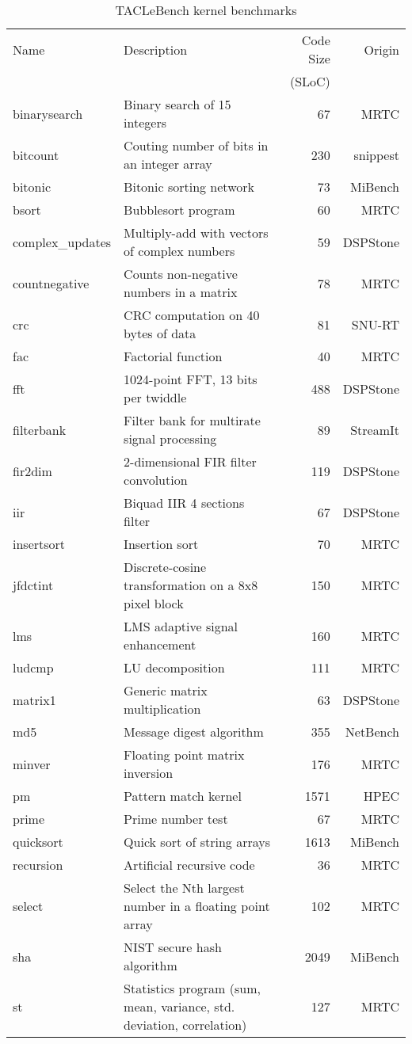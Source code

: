 \documentclass[a4paper,UKenglish]{oasics}
\begin{document}
\begin{table}
\centering
\caption{\label{tab:bench_kernel}TACLeBench kernel benchmarks}  
\begin{tabular}{lp{6cm}rr}
\toprule
Name & Description & Code Size & Origin\\
     &             &     (SLoC) & \\ \midrule
binarysearch & Binary search of 15 integers & 67 & MRTC \\
bitcount & Couting number of bits in an integer array & 230  & snippest \\
bitonic &  Bitonic sorting network  & 73 & MiBench \\
bsort & Bubblesort program & 60 & MRTC \\
complex\_updates &  Multiply-add with vectors of complex numbers & 59 & DSPStone \\
countnegative &  Counts non-negative numbers in a matrix  & 78 & MRTC \\
crc &  CRC computation on 40 bytes of data  & 81 & SNU-RT \\
fac &  Factorial function & 40 & MRTC \\
fft &  1024-point FFT, 13 bits per twiddle  & 488  & DSPStone \\
filterbank & Filter bank for multirate signal processing  & 89 & StreamIt \\
fir2dim &  2-dimensional FIR filter convolution & 119 & DSPStone \\
iir &  Biquad IIR 4 sections filter & 67 & DSPStone \\
insertsort & Insertion sort & 70 & MRTC \\
jfdctint & Discrete-cosine transformation on a 8x8 pixel block  & 150  & MRTC \\
lms &  LMS adaptive signal enhancement  & 160  & MRTC \\
ludcmp & LU decomposition & 111 & MRTC \\
matrix1 &  Generic matrix multiplication  & 63 & DSPStone \\
md5 &  Message digest algorithm & 355  & NetBench \\
minver & Floating point matrix inversion  & 176  & MRTC \\
pm & Pattern match kernel & 1571  & HPEC \\
prime &  Prime number test  & 67 & MRTC \\
quicksort &  Quick sort of string arrays  & 1613 & MiBench \\
recursion &  Artificial recursive code  & 36 & MRTC \\
select & Select the Nth largest number in a floating point array  & 102 & MRTC \\
sha &  NIST secure hash algorithm & 2049  & MiBench \\
st & Statistics program (sum, mean, variance, std. deviation, correlation)  & 127  & MRTC \\
\bottomrule
\end{tabular}
\end{table}
\end{document}
